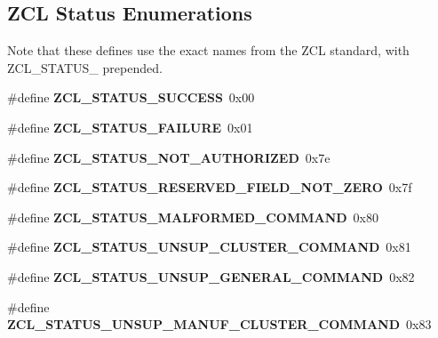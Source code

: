 \subsection*{Z\+CL Status Enumerations}
\label{_amgrp0e2bca1e4595fbe46ba15a7bdc1e2591}%
Note that these defines use the exact names from the Z\+CL standard, with Z\+C\+L\+\_\+\+S\+T\+A\+T\+U\+S\+\_\+ prepended. \begin{DoxyCompactItemize}
\item 
\mbox{\label{group__zcl_ga47e4ec72d1f3f241da408873d2666fdc}} 
\#define {\bfseries Z\+C\+L\+\_\+\+S\+T\+A\+T\+U\+S\+\_\+\+S\+U\+C\+C\+E\+SS}~0x00
\item 
\mbox{\label{group__zcl_gaab010fd0ef9bd352f1ef9f97477f1ad1}} 
\#define {\bfseries Z\+C\+L\+\_\+\+S\+T\+A\+T\+U\+S\+\_\+\+F\+A\+I\+L\+U\+RE}~0x01
\item 
\mbox{\label{group__zcl_gaf0bc5736d44e407eda875155084ce22b}} 
\#define {\bfseries Z\+C\+L\+\_\+\+S\+T\+A\+T\+U\+S\+\_\+\+N\+O\+T\+\_\+\+A\+U\+T\+H\+O\+R\+I\+Z\+ED}~0x7e
\item 
\mbox{\label{group__zcl_ga53669b6df991a0e56ca67823a5669f34}} 
\#define {\bfseries Z\+C\+L\+\_\+\+S\+T\+A\+T\+U\+S\+\_\+\+R\+E\+S\+E\+R\+V\+E\+D\+\_\+\+F\+I\+E\+L\+D\+\_\+\+N\+O\+T\+\_\+\+Z\+E\+RO}~0x7f
\item 
\mbox{\label{group__zcl_ga597a075f762fba23016d89a6029122c8}} 
\#define {\bfseries Z\+C\+L\+\_\+\+S\+T\+A\+T\+U\+S\+\_\+\+M\+A\+L\+F\+O\+R\+M\+E\+D\+\_\+\+C\+O\+M\+M\+A\+ND}~0x80
\item 
\mbox{\label{group__zcl_ga65af01126024e9e321d341767f6f96cb}} 
\#define {\bfseries Z\+C\+L\+\_\+\+S\+T\+A\+T\+U\+S\+\_\+\+U\+N\+S\+U\+P\+\_\+\+C\+L\+U\+S\+T\+E\+R\+\_\+\+C\+O\+M\+M\+A\+ND}~0x81
\item 
\mbox{\label{group__zcl_ga794bb528f7379a80b304d88ea3db9627}} 
\#define {\bfseries Z\+C\+L\+\_\+\+S\+T\+A\+T\+U\+S\+\_\+\+U\+N\+S\+U\+P\+\_\+\+G\+E\+N\+E\+R\+A\+L\+\_\+\+C\+O\+M\+M\+A\+ND}~0x82
\item 
\mbox{\label{group__zcl_gae1c212c2db7f6bc3fde9e5f1720451f2}} 
\#define {\bfseries Z\+C\+L\+\_\+\+S\+T\+A\+T\+U\+S\+\_\+\+U\+N\+S\+U\+P\+\_\+\+M\+A\+N\+U\+F\+\_\+\+C\+L\+U\+S\+T\+E\+R\+\_\+\+C\+O\+M\+M\+A\+ND}~0x83

\end{DoxyCompactItemize}
